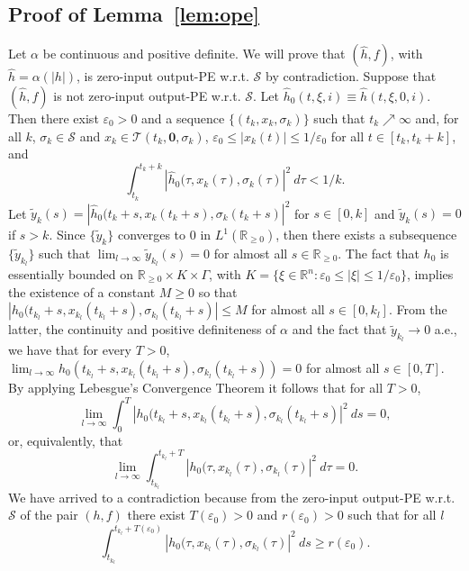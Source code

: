 \documentclass[9pt,final,journal]{IEEEtran}
\def\R{\mathbb{R}}
\def\S{\mathcal{S}}
\def\T{\mathcal{T}}
\begin{document}
\subsection{Proof of Lemma~\ref{lem:ope}}
\label{sec:pf-lem-ope}
Let $\alpha$ be continuous and positive definite. We will prove that $(\hat{h},f)$, with $\hat{h}=\alpha(|h|)$, is zero-input output-PE w.r.t. $\S$ by contradiction. Suppose that $(\hat{h},f)$ is not zero-input output-PE w.r.t. $\S$. Let $\hat{h}_0(t,\xi,i)\equiv \hat{h}(t,\xi,0,i)$. Then there exist $\varepsilon_0>0$ and a sequence $\{(t_k,x_k,\sigma_k)\}$ such that $t_k\nearrow \infty$ and, for all $k$, $\sigma_k\in \S$  and
$x_k\in \T(t_k,\mathbf{0},\sigma_k)$, $\varepsilon_0\le |x_k(t)|\le 1/\varepsilon_0$ for all $t\in [t_k,t_k+k]$, and 
 $$ \int_{t_k}^{t_{k}+k} |\hat{h}_0(\tau,x_k(\tau),\sigma_k(\tau)|^2\:d\tau<1/k.$$
 Let $\tilde y_k(s)=|\hat{h}_0(t_k+s,x_k(t_k+s),\sigma_k(t_k+s)|^2$ for $s\in [0,k]$ and $\tilde y_k(s)=0$ if $s>k$. Since $\{\tilde y_k\}$ converges to $0$ in $L^1(\R_{\ge 0})$, then there exists a subsequence $\{\tilde y_{k_l}\}$ such that $\lim_{l\to \infty}\tilde y_{k_l}(s)=0$ for almost all $s \in \R_{\ge 0}$. The fact that $h_0$ is essentially bounded on $\R_{\ge 0}\times K \times \Gamma$, with $K=\{\xi\in \R^n:\varepsilon_0\le |\xi|\le 1/\varepsilon_0\}$,  implies the existence of a constant $M\ge 0$ so that $|h_0(t_{k_l}+s,x_{k_l}(t_{k_l}+s),\sigma_{k_l}(t_{k_l}+s)|\le M$ for almost all $s\in [0,k_l]$. From the latter, the continuity and positive definiteness of $\alpha$ and the fact that $\tilde y_{k_l}\to 0$ a.e., we have that for every $T>0$, $\lim_{l\to \infty} h_0(t_{k_l}+s,x_{k_l}(t_{k_l}+s),\sigma_{k_l}(t_{k_l}+s))=0$ for almost all $s\in [0,T]$. By applying Lebesgue's Convergence Theorem it follows that for all $T>0$,
 $$ \lim_{l\to \infty} \int_0^T| h_0(t_{k_l}+s,x_{k_l}(t_{k_l}+s),\sigma_{k_l}(t_{k_l}+s)|^2\: ds=0,$$
 or, equivalently, that
  $$ \lim_{l\to \infty} \int_{t_{k_l}}^{t_{k_l}+T}| h_0(\tau,x_{k_l}(\tau),\sigma_{k_l}(\tau)|^2\: d\tau=0.$$
We have arrived to a contradiction because from the zero-input output-PE w.r.t. $\S$ of the pair $(h,f)$ there exist $T(\varepsilon_0)>0$ and $r(\varepsilon_0)>0$ such that for all $l$
$$ \int_{t_{k_l}}^{t_{k_l}+T(\varepsilon_0)}| h_0(\tau,x_{k_l}(\tau),\sigma_{k_l}(\tau)|^2\: ds\ge r(\varepsilon_0).$$
\hfill \QED

%

\end{document}
